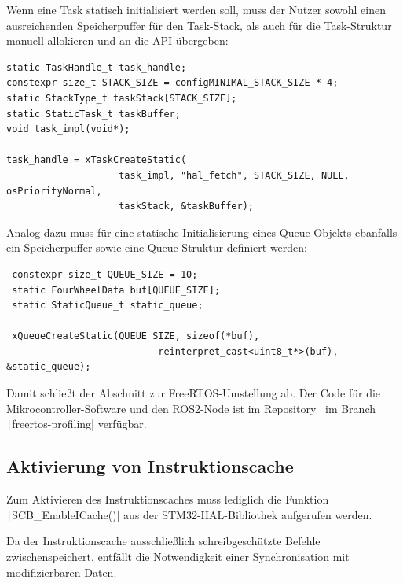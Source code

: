 Wenn eine Task statisch initialisiert werden soll, muss der Nutzer sowohl einen
ausreichenden Speicherpuffer für den Task-Stack, als auch für die Task-Struktur
manuell allokieren und an die API übergeben:

\begin{code}
\begin{verbatim}
static TaskHandle_t task_handle;
constexpr size_t STACK_SIZE = configMINIMAL_STACK_SIZE * 4;
static StackType_t taskStack[STACK_SIZE];
static StaticTask_t taskBuffer;
void task_impl(void*);

task_handle = xTaskCreateStatic(
                    task_impl, "hal_fetch", STACK_SIZE, NULL, osPriorityNormal,
                    taskStack, &taskBuffer);
\end{verbatim}
\end{code}

Analog dazu muss für eine statische Initialisierung eines Queue-Objekts
ebanfalls ein Speicherpuffer sowie eine Queue-Struktur definiert werden:

\begin{code}
\begin{verbatim}
 constexpr size_t QUEUE_SIZE = 10;
 static FourWheelData buf[QUEUE_SIZE];
 static StaticQueue_t static_queue;

 xQueueCreateStatic(QUEUE_SIZE, sizeof(*buf),
                           reinterpret_cast<uint8_t*>(buf), &static_queue);
\end{verbatim}
\end{code}

Damit schließt der Abschnitt zur FreeRTOS-Umstellung ab. Der Code für die
Mikrocontroller-Software und den ROS2-Node ist im
Repository~\cite{mecarover_freertos_profiling} im Branch
\texttt|freertos-profiling| verfügbar.

\subsection{Aktivierung von Instruktionscache}

Zum Aktivieren des Instruktionscaches muss lediglich die Funktion
\texttt|SCB_EnableICache()| aus der STM32-HAL-Bibliothek aufgerufen
werden.

Da der Instruktionscache ausschließlich schreibgeschützte Befehle
zwischenspeichert, entfällt die Notwendigkeit einer Synchronisation mit
modifizierbaren Daten.

